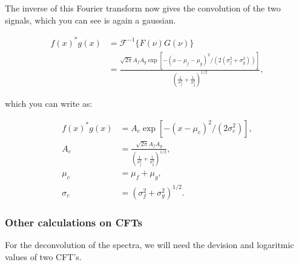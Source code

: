 The inverse of this Fourier transform now gives the convolution of the two signals, which you can see is again a gaussian.

\begin{equation}
\begin{aligned}
f(x)^* g(x) &=  \mathcal{F}^{-1}\{F(\nu)G(\nu)\} \\
&= \frac{\sqrt{2 \pi} A_f A_g \exp{\left[-(x-\mu_f-\mu_g)^{2} /\left(2\left(\sigma_f^{2}+\sigma_g^{2}\right)\right)\right]}}{\left(\frac{1}{\sigma_f^{2}}+\frac{1}{\sigma_g^{2}}\right)^{1/2}},
\end{aligned}
\end{equation}


which you can write as:

\begin{equation}\label{eq_gauss_conv}
\begin{aligned}
f(x)^* g(x) &= A_c \exp{[-(x-\mu_c)^2/(2\sigma_c^2)]},\\
A_c &= \frac{\sqrt{2 \pi} A_f A_g}{\left(\frac{1}{\sigma_f^{2}}+\frac{1}{\sigma_g^{2}}\right)^{1/2}},\\
\mu_c &= \mu_f + \mu_g,\\
\sigma_c &= (\sigma_f^2 + \sigma_g^2)^{1/2}.
\end{aligned}
\end{equation}

\subsubsection{Other calculations on CFTs}
For the deconvolution of the spectra, we will need the devision and logaritmic values of two CFT's. 













